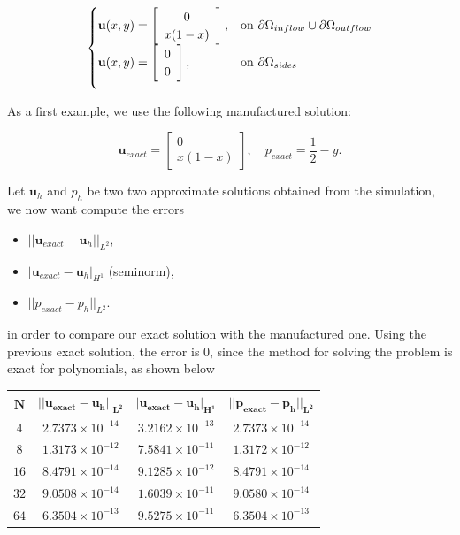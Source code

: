 \documentclass[11pt,a4paper,titlepage]{report}
\begin{document}
\[
\begin{cases}
\mathbf{u}(x,y) = \left[ \begin{array}{c} 0 \\ x(1-x) \end{array} \right] , & \mbox{on } \partial \Omega_{inflow} \cup \partial \Omega_{outflow} \\

\vspace{.2cm}

\mathbf{u}(x,y) = \left[ \begin{array}{c} 0 \\ 0 \end{array} \right], & \mbox{on } \partial \Omega_{sides}
\end{cases}
\]

As a first example, we use the following manufactured solution:

\[
\mathbf{u}_{exact} = \left[ \begin{array}{c} 0 \\ x(1-x) \end{array} \right], \quad
p_{exact} = \frac{1}{2}-y.
\]

Let $\mathbf{u}_h$ and $p_h$ be two two approximate solutions obtained from the simulation, we now want compute the errors

\begin{itemize}
\item $|| \mathbf{u}_{exact} - \mathbf{u}_h ||_{L^2}$,
\item $ | \mathbf{u}_{exact} - \mathbf{u}_h |_{H^1}$ (seminorm),
\item $|| p_{exact} - p_h ||_{L^2} $.
\end{itemize}

in order to compare our exact solution with the manufactured one.
Using the previous exact solution, the error is 0, since the method for solving the problem is exact for polynomials, as shown below


\begin{center}
\begin{tabular}{| c | c | c | c |}
\hline
$\mathbf{N}$ & $\mathbf{|| u_{exact} - u_h ||_{L^2}}$ & $ \mathbf{ | u_{exact} - u_h |_{H^1}}$ & $  \mathbf{ || p_{exact} - p_h ||_{L^2}}$ \\
\hline
$ 4 $ & $2.7373 \times 10^{-14}$ & $3.2162 \times 10^{-13}$ &  $ 2.7373 \times 10^{-14}$ \\
\hline
$ 8$ & $1.3173  \times 10^{-12}$ & $7.5841 \times 10^{-11}$ &  $ 1.3172  \times 10^{-12}$ \\
\hline
$ 16 $ & $ 8.4791 \times 10^{-14}$ & $9.1285 \times 10^{-12}$ & $ 8.4791 \times 10^{-14}$ \\
\hline
$ 32$ & $9.0508 \times 10^{-14}$ & $1.6039 \times 10^{-11}$ &  $ 9.0580 \times 10^{-14}$ \\
\hline
$ 64$ & $6.3504 \times 10^{-13}$ & $9.5275 \times 10^{-11}$ &  $ 6.3504 \times 10^{-13}$ \\
\hline
\end{tabular}
\end{center}
\end{document}
